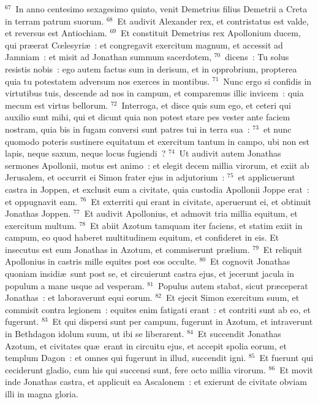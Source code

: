 ${}^{67}$~In anno centesimo sexagesimo quinto, venit Demetrius filius Demetrii a Creta in terram patrum suorum.
${}^{68}$~Et audivit Alexander rex, et contristatus est valde, et reversus est Antiochiam.
${}^{69}$~Et constituit Demetrius rex Apollonium ducem, qui pr\ae erat Cœlesyri\ae~: et congregavit exercitum magnum, et accessit ad Jamniam~: et misit ad Jonathan summum sacerdotem,
${}^{70}$~dicens~: Tu solus resistis nobis~: ego autem factus sum in derisum, et in opprobrium, propterea quia tu potestatem adversum nos exerces in montibus.
${}^{71}$~Nunc ergo si confidis in virtutibus tuis, descende ad nos in campum, et comparemus illic invicem~: quia mecum est virtus bellorum.
${}^{72}$~Interroga, et disce quis sum ego, et ceteri qui auxilio sunt mihi, qui et dicunt quia non potest stare pes vester ante faciem nostram, quia bis in fugam conversi sunt patres tui in terra sua~:
${}^{73}$~et nunc quomodo poteris sustinere equitatum et exercitum tantum in campo, ubi non est lapis, neque saxum, neque locus fugiendi~?
${}^{74}$~Ut audivit autem Jonathas sermones Apollonii, motus est animo~: et elegit decem millia virorum, et exiit ab Jerusalem, et occurrit ei Simon frater ejus in adjutorium~:
${}^{75}$~et applicuerunt castra in Joppen, et exclusit eum a civitate, quia custodia Apollonii Joppe erat~: et oppugnavit eam.
${}^{76}$~Et exterriti qui erant in civitate, aperuerunt ei, et obtinuit Jonathas Joppen.
${}^{77}$~Et audivit Apollonius, et admovit tria millia equitum, et exercitum multum.
${}^{78}$~Et abiit Azotum tamquam iter faciens, et statim exiit in campum, eo quod haberet multitudinem equitum, et confideret in eis. Et insecutus est eum Jonathas in Azotum, et commiserunt pr\ae lium.
${}^{79}$~Et reliquit Apollonius in castris mille equites post eos occulte.
${}^{80}$~Et cognovit Jonathas quoniam insidi\ae\ sunt post se, et circuierunt castra ejus, et jecerunt jacula in populum a mane usque ad vesperam.
${}^{81}$~Populus autem stabat, sicut pr\ae ceperat Jonathas~: et laboraverunt equi eorum.
${}^{82}$~Et ejecit Simon exercitum suum, et commisit contra legionem~: equites enim fatigati erant~: et contriti sunt ab eo, et fugerunt.
${}^{83}$~Et qui dispersi sunt per campum, fugerunt in Azotum, et intraverunt in Bethdagon idolum suum, ut ibi se liberarent.
${}^{84}$~Et succendit Jonathas Azotum, et civitates qu\ae\ erant in circuitu ejus, et accepit spolia eorum, et templum Dagon~: et omnes qui fugerunt in illud, succendit igni.
${}^{85}$~Et fuerunt qui ceciderunt gladio, cum his qui succensi sunt, fere octo millia virorum.
${}^{86}$~Et movit inde Jonathas castra, et applicuit ea Ascalonem~: et exierunt de civitate obviam illi in magna gloria.
